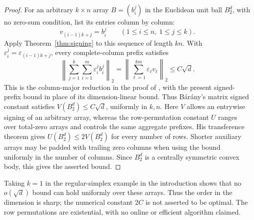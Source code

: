 \begin{proof}
For an arbitrary $k\times n$ array $B=(b_i^j)$ in the Euclidean unit
ball $B_2^d$, with no zero-sum condition, list its entries column by
column:
\[
 v_{(i-1)k+j}=b_i^j
 \qquad(1\le i\le n,\ 1\le j\le k).
\]
Apply Theorem~\ref{thm:signing} to this sequence of length $kn$. With
$\varepsilon_i^j=\varepsilon_{(i-1)k+j}$, every complete-column prefix
satisfies
\[
 \left\lVert\sum_{j=1}^k\sum_{i=1}^m\varepsilon_i^j b_i^j\right\rVert_2
 =
 \left\lVert\sum_{\ell=1}^{km}\varepsilon_\ell v_\ell\right\rVert_2
 \le C\sqrt d.
\]
This is the column-major reduction in the proof of
\cite[Lemma~2.1]{Barany2024Matrix}, with the present signed-prefix bound
in place of its dimension-linear bound. Thus B\'ar\'any's matrix signed
constant satisfies $V(B_2^d)\le C\sqrt d$, uniformly in $k,n$.
Here $V$ allows an entrywise signing of an arbitrary array, whereas the
row-permutation constant $U$ ranges over total-zero arrays and controls
the same aggregate prefixes. His transference theorem
\cite[Theorem~2.2]{Barany2024Matrix} gives $U(B_2^d)\le2V(B_2^d)$ for
every number of rows. Shorter auxiliary arrays may be padded with
trailing zero columns when using the bound uniformly in the number of
columns. Since $B_2^d$ is a centrally symmetric convex body, this gives
the asserted bound.
\end{proof}

Taking $k=1$ in the regular-simplex example in the introduction shows that no
$o(\sqrt d)$ bound can hold uniformly over these arrays. Thus the order
in the dimension is sharp; the numerical constant $2C$ is not asserted
to be optimal. The row permutations are existential, with no online or
efficient algorithm claimed.
